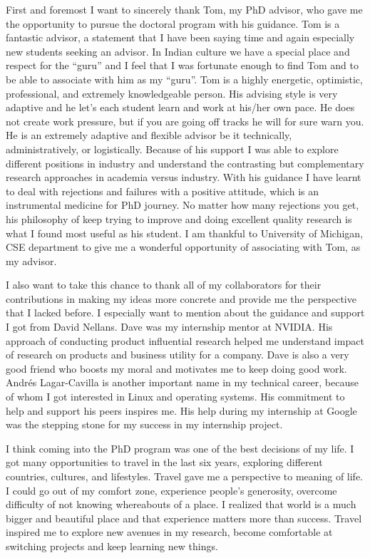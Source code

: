 First and foremost I want to sincerely thank Tom, my PhD advisor, who gave me the
opportunity to pursue the doctoral program with his guidance. Tom is a fantastic
advisor, a statement that I have been saying time and again especially new
students seeking an advisor. In Indian culture we have a special place and
respect for the ``guru'' and I feel that I was fortunate enough to find Tom and
to be able to associate with him as my ``guru''. Tom is a highly energetic,
optimistic, professional, and extremely knowledgeable person. His advising style
is very adaptive and he let's each student learn and work at his/her own pace.
He does not create work pressure, but if you are going off tracks he will for
sure warn you. He is an extremely adaptive and flexible advisor be it technically,
administratively, or logistically. Because of his support I was able to explore
different positions in industry and understand the contrasting but complementary
research approaches in academia versus industry. With his guidance I have learnt
to deal with rejections and failures with a positive attitude, which is an
instrumental medicine for PhD journey. No matter how many rejections you get,
his philosophy of keep trying to improve and doing excellent quality research is
what I found most useful as his student. I am thankful to University of
Michigan, CSE department to give me a wonderful opportunity of associating with
Tom, as my advisor.

I also want to take this chance to thank all of my collaborators for their
contributions in making my ideas more concrete and provide me the perspective
that I lacked before. I especially want to mention about the guidance and
support I got from David Nellans. Dave was my internship mentor at NVIDIA.  His
approach of conducting product influential research helped me understand impact
of research on products and business utility for a company.  Dave is also a very
good friend who boosts my moral and motivates me to keep doing good work.
Andr\'es Lagar-Cavilla is another important name in my technical career,
because of whom I got interested in Linux and operating systems. His commitment
to help and support his peers inspires me. His help during my internship at
Google was the stepping stone for my success in my internship project.

I think coming into the PhD program was one of the best decisions of my life. I
got many opportunities to travel in the last six years, exploring different
countries, cultures, and lifestyles. Travel gave me a perspective to meaning of
life. I could go out of my comfort zone, experience people's generosity,
overcome difficulty of not knowing whereabouts of a place. I realized that world
is a much bigger and beautiful place and that experience matters more than
success. Travel inspired me to explore new avenues in my research, become
comfortable at switching projects and keep learning new things.

